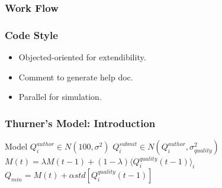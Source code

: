 \documentclass{beamer}
\begin{document}
\begin{frame}
  \frametitle{Work Flow}
  
\begin{figure}
  \centering
\end{figure}

\end{frame}

\begin{frame}
\frametitle{Code Style}

\begin{itemize}
  \item \large{Objected-oriented for extendibility.}
  \item \large{Comment to generate help doc.}
  \item \large{Parallel for simulation.}
\end{itemize}

\end{frame}

\begin{frame}
\frametitle{Thurner's Model: Introduction}

\begin{block}{Model}
$Q_{i}^{author} \in N(100, \sigma^{2})$
\bigskip
$Q_{i}^{submit} \in N(Q_{i}^{author}, \sigma^{2}_{quality})$
\bigskip
$M(t) = \lambda M(t-1) + (1 - \lambda) \langle Q_{i}^{quality}(t-1)\rangle_{i}$
\bigskip
$Q_{min} = M(t) + \alpha std[Q_{i}^{quality}(t-1)]$
\end{block}

\end{frame}
\end{document}
